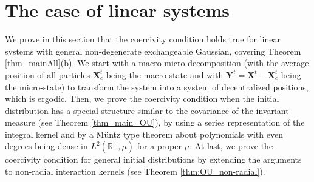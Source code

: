 \documentclass[]{elsarticle}
\def\R{\mathbb{R}}
\newcommand{\mbf}[1]{\boldsymbol{#1}}
\newcommand{\innerp}[2]{\langle #1,#2 \rangle}
\newcommand{\bX}{\mbf{X}}
\newcommand{\bY}{\mbf{Y}}
\newcommand{\red}[1]{\textcolor{red}{{#1}}}
\newtheorem{proposition}[theorem]{Proposition}
\numberwithin{equation}{section}
\numberwithin{theorem}{section}
\begin{document}
\begin{comment}
\red{This following proposition might be wrong: suppose $p_t(u,v)$ to be strictly positive, \\
1. $\innerp{u}{v}p_t(u,v)$ may not be strictly positive, because $\innerp{u}{v}$ is not strictly positive. Consider the corresponding matrices, A PD and $B= (\innerp{u_i}{u_j})$ is positive semi-definite with rank 1, then $AB$ must be of rank 1 and not positive-definite.\\
2. It follows directly that $K(r,s)$ is positive semi-definite. But I can NOT show that it is strictly positive in general (except the Gaussian case) or give a counter-example.  
} 

\begin{proposition}
If the joint density $p_t(u,v)$ is positive-definite, then $K_t(r,s)$ in \eqref{eq:kernelK_t} is positive-definite. \\
If $p_t(u,v)$ is continuous and strictly positive-definite, then $K_t(r,s)$  is continuous and \red{strictly} positive-definite.
\end{proposition}

Section 3.1 does not rely on this proposition, so everything there still holds true. 
\end{comment}



\section{The case of linear systems} \label{sec:OU}
We prove in this section that the coercivity condition holds true for linear systems with general non-degenerate exchangeable Gaussian, covering Theorem \ref{thm_mainAll}(b). We start with a macro-micro decomposition (with the average position of all particles $\bX_c^t$ being the macro-state and with $\bY^t= \bX^t-\bX_c^t$ being the micro-state) to transform the system into a system of decentralized positions, which is ergodic. Then, we prove the coercivity condition when the initial distribution has a special structure similar to the covariance of the invariant measure (see Theorem \ref{thm_main_OU}), by using a series representation of the integral kernel and by a M\"untz type theorem about polynomials with even degrees being dense in $L^2(\R^+,\mu)$ for a proper $\mu$.  At last, we prove the coercivity condition for general initial distributions by extending the arguments to non-radial interaction kernels (see Theorem \ref{thm:OU_non-radial}).  
\end{document}

